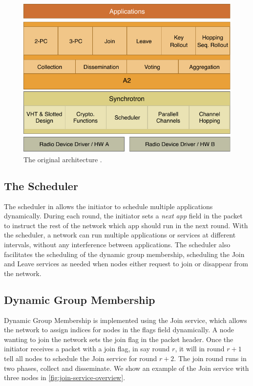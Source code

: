 \begin{figure}[bt]
    \centering
    \includegraphics[scale=0.7]{figure/architecture_original_a2.pdf}
    \caption{The original \atwo{} architecture \cite{a2-introduction-paper}.}
    \label{fig:original-a2-architecture}
\end{figure}

\subsection{The Scheduler}
The scheduler in \atwo{} allows the initiator to schedule multiple applications dynamically. During each round, the initiator sets a \textit{next app} field in the packet to instruct the rest of the network which app should run in the next round. With the scheduler, a network can run multiple applications or services at different intervals, without any interference between applications. The scheduler also facilitates the scheduling of the dynamic group membership, scheduling the Join and Leave services as needed when nodes either request to join or disappear from the network.

\subsection{Dynamic Group Membership}
\label{background-a2-join-service}
Dynamic Group Membership is implemented using the Join service, which allows the network to assign indices for nodes in the flags field dynamically. A node wanting to join the network sets the join flag in the packet header. Once the initiator receives a packet with a join flag, in say round $r$, it will in round $r + 1$ tell all nodes to schedule the Join service for round $r + 2$. The join round runs in two phases, collect and disseminate. We show an example of the Join service with three nodes in \cref{fig:join-service-overview}.

